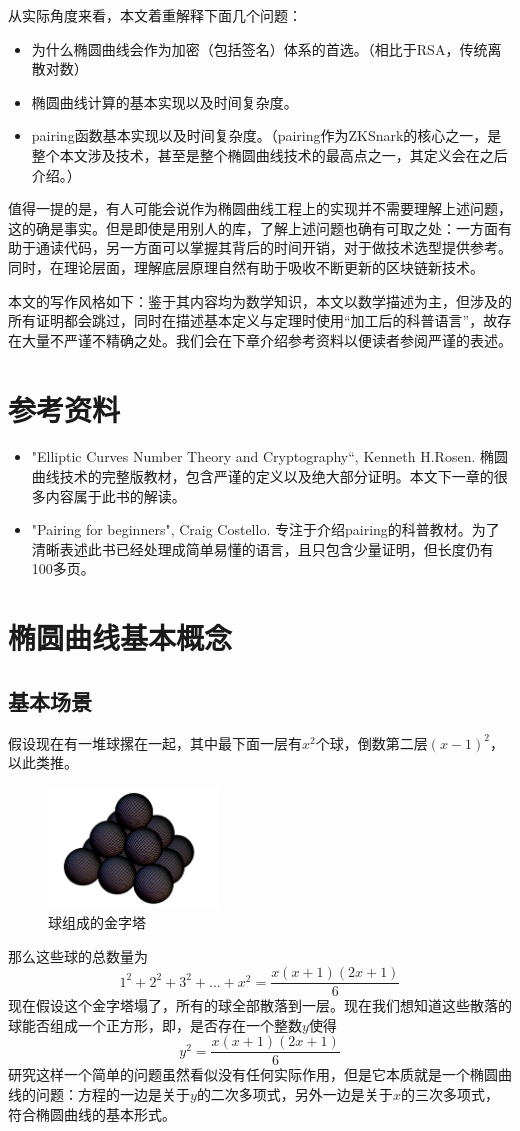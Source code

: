 \documentclass[12pt]{article}
\newcommand{\ec}{椭圆曲线}
\begin{document}
从实际角度来看，本文着重解释下面几个问题：
\begin{itemize}
	\item 为什么椭圆曲线会作为加密（包括签名）体系的首选。（相比于RSA，传统离散对数）
	\item 椭圆曲线计算的基本实现以及时间复杂度。
	\item pairing函数基本实现以及时间复杂度。（pairing作为ZKSnark的核心之一，是整个本文涉及技术，甚至是整个椭圆曲线技术的最高点之一，其定义会在之后介绍。）
\end{itemize}
值得一提的是，有人可能会说作为椭圆曲线工程上的实现并不需要理解上述问题，这的确是事实。但是即使是用别人的库，了解上述问题也确有可取之处：一方面有助于通读代码，另一方面可以掌握其背后的时间开销，对于做技术选型提供参考。同时，在理论层面，理解底层原理自然有助于吸收不断更新的区块链新技术。

本文的写作风格如下：鉴于其内容均为数学知识，本文以数学描述为主，但涉及的所有证明都会跳过，同时在描述基本定义与定理时使用“加工后的科普语言”，故存在大量不严谨不精确之处。我们会在下章介绍参考资料以便读者参阅严谨的表述。
\section{参考资料}
\begin{itemize}
\item "Elliptic Curves Number Theory and Cryptography“, Kenneth H.Rosen. 椭圆曲线技术的完整版教材，包含严谨的定义以及绝大部分证明。本文下一章的很多内容属于此书的解读。
\item "Pairing for beginners", Craig Costello. 专注于介绍pairing的科普教材。为了清晰表述此书已经处理成简单易懂的语言，且只包含少量证明，但长度仍有100多页。
\end{itemize}
\section{椭圆曲线基本概念}
\subsection{基本场景}
假设现在有一堆球摞在一起，其中最下面一层有$x^2$个球，倒数第二层$(x-1)^2$，以此类推。
\begin{figure}[H]
	\centering
	\label{fig:balls}
	\includegraphics[width=0.4\textwidth]{../common/ball.png}
	\caption{球组成的金字塔}
\end{figure}
那么这些球的总数量为
$$1^2+2^2+3^2+...+x^2=\frac{x(x+1)(2x+1)}{6}$$
现在假设这个金字塔塌了，所有的球全部散落到一层。现在我们想知道这些散落的球能否组成一个正方形，即，是否存在一个整数$y$使得
$$y^2=\frac{x(x+1)(2x+1)}{6}$$
研究这样一个简单的问题虽然看似没有任何实际作用，但是它本质就是一个椭圆曲线的问题：方程的一边是关于$y$的二次多项式，另外一边是关于$x$的三次多项式，符合\ec 的基本形式。
\end{document}
